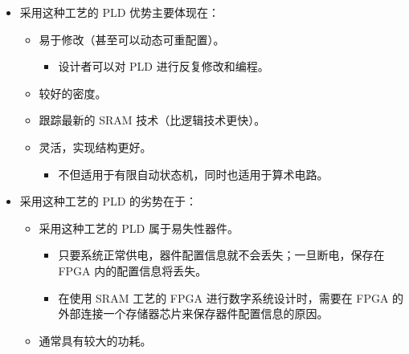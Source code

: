 \documentclass[
  ignorenonframetext,
  chinese,
]{beamer}
\providecommand{\tightlist}{%
  \setlength{\itemsep}{0pt}\setlength{\parskip}{0pt}}
\begin{document}
\begin{frame}
\begin{itemize}
\tightlist
\item
  采用这种工艺的 PLD 优势主要体现在：

  \begin{itemize}
  \tightlist
  \item
    易于修改（甚至可以动态可重配置）。

    \begin{itemize}
    \tightlist
    \item
      设计者可以对 PLD 进行反复修改和编程。
    \end{itemize}
  \item
    较好的密度。
  \item
    跟踪最新的 SRAM 技术（比逻辑技术更快）。
  \item
    灵活，实现结构更好。

    \begin{itemize}
    \tightlist
    \item
      不但适用于有限自动状态机，同时也适用于算术电路。
    \end{itemize}
  \end{itemize}
\item
  采用这种工艺的 PLD 的劣势在于：

  \begin{itemize}
  \tightlist
  \item
    采用这种工艺的 PLD 属于易失性器件。

    \begin{itemize}
    \tightlist
    \item
      只要系统正常供电，器件配置信息就不会丢失；一旦断电，保存在 FPGA
      内的配置信息将丢失。
    \item
      在使用 SRAM 工艺的 FPGA 进行数字系统设计时，需要在 FPGA
      的外部连接一个存储器芯片来保存器件配置信息的原因。
    \end{itemize}
  \item
    通常具有较大的功耗。
  \end{itemize}
\end{itemize}
\end{frame}
\end{document}
